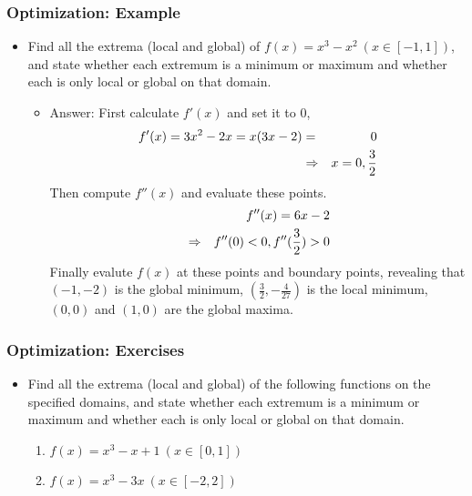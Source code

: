 \documentclass[pdflatex, 12pt]{beamer}
\begin{document}
\begin{frame}
\frametitle{Optimization: Example}
\begin{itemize}
\item Find all the extrema (local and global) of $f(x) = x^3 - x^2 \ (x \in [-1, 1])$, and state whether each extremum is a minimum or maximum and whether each is only local or global on that domain.
 \begin{itemize}
 \item Answer: First calculate $f'(x)$ and set it to 0,
  \begin{eqnarray}
  f'(x) = 3x^2 - 2x = x(3x - 2) &=& 0 \notag \\
  &\Rightarrow& x = 0, \frac{3}{2} \notag
  \end{eqnarray}
 Then compute $f''(x)$ and evaluate these points.
  \begin{eqnarray}
  && f''(x) = 6x - 2 \notag \\
  &\Rightarrow& f''(0) < 0, f''(\frac{3}{2}) > 0 \notag
  \end{eqnarray}
 Finally evalute $f(x)$ at these points and boundary points, revealing that $(-1, -2)$ is the global minimum, $(\frac{3}{2}, -\frac{4}{27})$ is the local minimum, $(0 ,0 )$ and $(1, 0)$ are the global maxima.
 \end{itemize}
\end{itemize}
\end{frame}

\begin{frame}
\frametitle{Optimization: Exercises}
\begin{itemize}
\item Find all the extrema (local and global) of the following functions on the specified domains, and state whether each extremum is a minimum or maximum and whether each is only local or global on that domain.
 \begin{enumerate}
 \item $f(x) = x^3 - x + 1 \ (x \in [0, 1])$
 \item $f(x) = x^3 - 3x \ (x \in [-2, 2])$
 \end{enumerate}
\end{itemize}
\end{frame}
\end{document}
